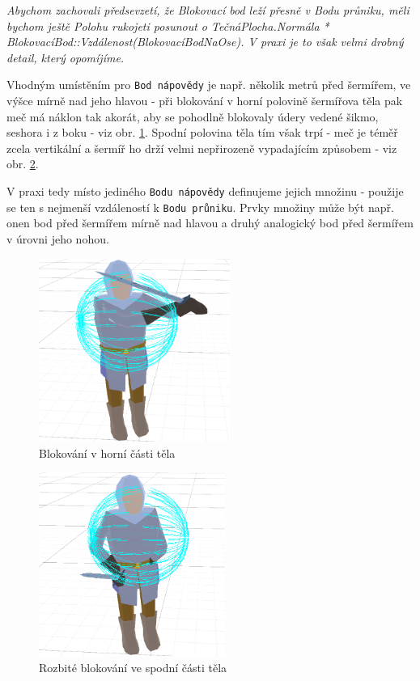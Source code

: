 \textit{Abychom zachovali předsevzetí, že \textit{Blokovací bod} leží přesně v \textit{Bodu průniku}, měli bychom ještě \textit{Polohu rukojeti} posunout o \textit{TečnáPlocha.Normála * BlokovacíBod::Vzdálenost(BlokovacíBodNaOse)}. V praxi je to však velmi drobný detail, který opomíjíme.}

Vhodným umístěním pro \texttt{Bod nápovědy} je např. několik metrů před šermířem, ve výšce mírně nad jeho hlavou - při blokování v horní polovině šermířova těla pak meč má náklon tak akorát, aby se pohodlně blokovaly údery vedené šikmo, seshora i z boku - viz obr. \ref{obr04:blockingGood}. Spodní polovina těla tím však trpí - meč je téměř zcela vertikální a šermíř ho drží velmi nepřirozeně vypadajícím způsobem - viz obr. \ref{obr04:blockingBad}. 
 
V praxi tedy místo jediného \texttt{Bodu nápovědy} definujeme jejich množinu - použije se ten s nejmenší vzdáleností k \texttt{Bodu průniku}. Prvky množiny může být např. onen bod před šermířem mírně nad hlavou a druhý analogický bod před šermířem v úrovni jeho nohou.  

\begin{figure}[ht]\centering
    \center
    \includegraphics[height=60mm]{../img/blocking-good.png}
    \caption{Blokování v horní části těla}
    \label{obr04:blockingGood}
\end{figure} 

\begin{figure}[ht]\centering
    \center
    \includegraphics[height=60mm]{../img/blocking-bad.png}
    \caption{Rozbité blokování ve spodní části těla}
    \label{obr04:blockingBad}
\end{figure} 


